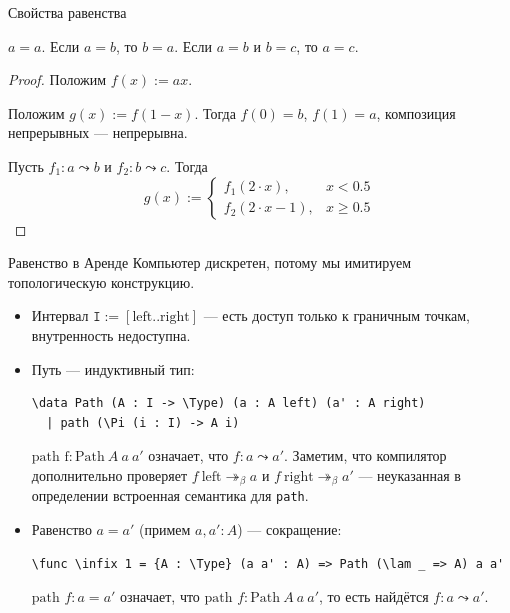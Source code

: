 \documentclass[aspectratio=169]{beamer}
\begin{document}
\begin{frame}{Свойства равенства}
\begin{thm}
$a = a$.
Если $a = b$, то $b = a$.
Если $a = b$ и $b = c$, то $a = c$.
\end{thm}
\begin{proof}
Положим $f(x) := ax$.

Положим $g(x) := f(1 - x)$. Тогда $f(0) = b$, $f(1) = a$, композиция непрерывных --- непрерывна.

Пусть $f_1: a \leadsto b$ и $f_2: b \leadsto c$.
Тогда $$g(x) := \left\{\begin{array}{ll}f_1(2\cdot x),& x < 0.5\\f_2(2\cdot x -1),& x\ge 0.5\end{array}\right.$$
\end{proof}
\end{frame}

\begin{frame}[fragile]{Равенство в Аренде}
Компьютер дискретен, потому мы имитируем топологическую конструкцию.
\begin{itemize}
\item Интервал $\texttt{I} := [\text{left}..\text{right}]$ --- есть доступ только к граничным точкам, внутренность недоступна.
\item Путь --- индуктивный тип:
\small\color[HTML]{025002}\begin{verbatim}
\data Path (A : I -> \Type) (a : A left) (a' : A right)
  | path (\Pi (i : I) -> A i)
\end{verbatim}\normalsize
\color{black}

$\text{path f}:\text{Path}\ A\ a\ a'$  означает, что $f: a \leadsto a'$.
Заметим, что компилятор дополнительно проверяет $f\ \text{left}\twoheadrightarrow_\beta a$ и $f\ \text{right}\twoheadrightarrow_\beta a'$ --- 
неуказанная в определении встроенная семантика для \verb!path!.
\item Равенство $a = a'$ (примем $a,a':A$) --- сокращение:
\small\color[HTML]{025002}\begin{verbatim}
\func \infix 1 = {A : \Type} (a a' : A) => Path (\lam _ => A) a a'
\end{verbatim}\normalsize
\color{black}

$\text{path }f : a = a'$ означает, что $\text{path }f:\text{Path}\ A\ a\ a'$, то есть найдётся $f : a \leadsto a'$.
\end{itemize}
\end{frame}
\end{document}
